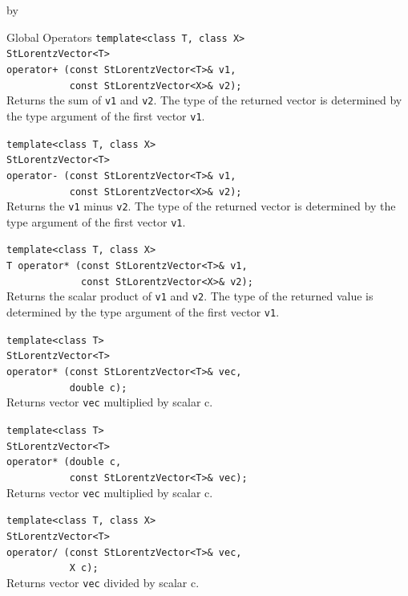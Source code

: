 \documentclass[twoside]{article}
\newcommand{\comp}[1]{\texttt{#1}}%
\newcommand{\entrylabel}[1]{\mbox{\textbf{{#1}}}\hfil}%
\newenvironment{entry}
{\begin{list}{}%
    {\renewcommand{\makelabel}{\entrylabel}%
     \setlength{\labelwidth}{90pt}%
     \setlength{\leftmargin}{\labelwidth}
     \advance\leftmargin by \labelsep%
      }%
    }%
  {\end{list}}
\newcommand{\Entrylabel}[1]%
{\raisebox{0pt}[1ex][0pt]{\makebox[\labelwidth][l]%
    {\parbox[t]{\labelwidth}{\hspace{0pt}\textbf{{#1}}}}}}
\newenvironment{Entry}%
{\renewcommand{\entrylabel}{\Entrylabel}\begin{entry}}%
  {\end{entry}}
\begin{document}
\begin{Entry}
\item[Global Operators]
    \verb+template<class T, class X>+\\
    \verb+StLorentzVector<T>+\\
    \verb#operator+ (const StLorentzVector<T>& v1,#\\
    \verb+           const StLorentzVector<X>& v2);+\\
    Returns the sum of \comp{v1} and \comp{v2}.
    The type of the returned vector is determined by the type
    argument of the first vector \comp{v1}.
    
    \verb+template<class T, class X>+\\
    \verb+StLorentzVector<T>+\\
    \verb+operator- (const StLorentzVector<T>& v1,+\\
    \verb+           const StLorentzVector<X>& v2);+\\
    Returns the \comp{v1} minus \comp{v2}.
    The type of the returned vector is determined by the type
    argument of the first vector \comp{v1}.
     
    \verb+template<class T, class X>+\\
    \verb+T operator* (const StLorentzVector<T>& v1,+\\
    \verb+             const StLorentzVector<X>& v2);+\\
    Returns the scalar product of \comp{v1} and \comp{v2}.
    The type of the returned value is determined by the type
    argument of the first vector \comp{v1}.
    
    \verb+template<class T>+\\
    \verb+StLorentzVector<T>+\\
    \verb+operator* (const StLorentzVector<T>& vec,+\\
    \verb+           double c);+\\
    Returns vector \comp{vec} multiplied by scalar c.
    
    \verb+template<class T>+\\
    \verb+StLorentzVector<T>+\\
    \verb+operator* (double c,+\\
    \verb+           const StLorentzVector<T>& vec);+\\
    Returns vector \comp{vec} multiplied by scalar c.
    
    \verb+template<class T, class X>+\\
    \verb+StLorentzVector<T>+\\
    \verb+operator/ (const StLorentzVector<T>& vec,+\\
    \verb+           X c);+\\
    Returns vector \comp{vec} divided by scalar c.


\end{Entry}
\end{document}
